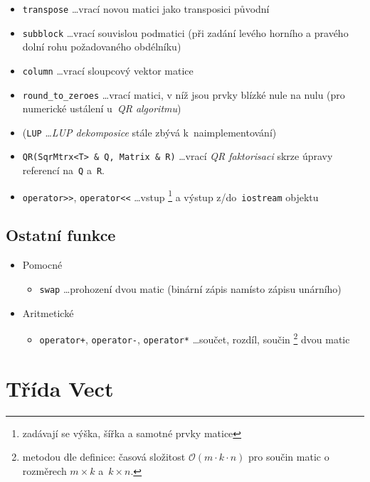 \documentclass[11pt,a4paper]{article}
\theoremstyle{remark}
\begin{document}
\begin{itemize}
\begin{itemize}
    \item \verb~transpose~ \ldots vrací novou matici jako transposici původní
    \item \verb~subblock~ \ldots vrací souvislou podmatici (při zadání levého
      horního a pravého dolní rohu požadovaného obdélníku)
    \item \verb~column~ \ldots vrací sloupcový vektor matice
    \item \verb~round_to_zeroes~ \ldots vrací matici, v níž jsou prvky blízké
      nule na nulu  (pro numerické ustálení
      u~\emph{QR algoritmu\/})
    \item (\verb~LUP~ \ldots \emph{LUP dekomposice\/} stále zbývá
      k~naimplementování)
    \item \verb~QR(SqrMtrx<T> & Q, Matrix & R)~ \ldots vrací \emph{QR
    faktorisaci\/} skrze úpravy referencí na~\verb~Q~ a~\verb~R~.
    \item \verb~operator>>~, \verb~operator<<~ \ldots vstup\thinspace%
      \footnote{zadávají se výška, šířka a samotné prvky matice}
      a výstup z/do~\verb~iostream~ objektu
  \end{itemize}
\end{itemize}

\subsection{Ostatní funkce}

\begin{itemize}
\item Pomocné
  \begin{itemize}
  \item \verb~swap~ \ldots prohození dvou matic (binární zápis namísto
    zápisu unárního)
  \end{itemize}
\item Aritmetické
  \begin{itemize}
  \item \verb~operator+~, \verb~operator-~, \verb~operator*~ \ldots součet,
    rozdíl, součin\thinspace%
    \footnote{metodou dle definice: časová složitost $\mathcal{O}(m \cdot k
    \cdot n)$ pro součin matic o rozměrech $m \times k$ a~$k \times n$.}
    dvou matic
  \end{itemize}
\end{itemize}

\section{Třída Vect}
\end{document}
